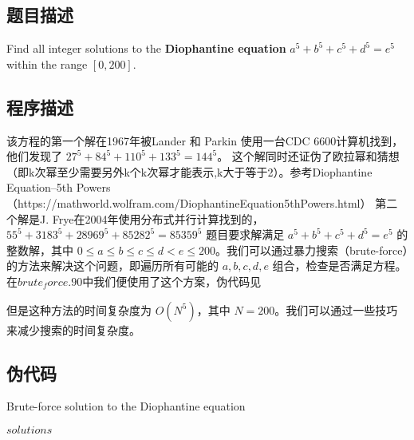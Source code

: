 \subsection{题目描述}
Find all integer solutions to the \textbf{Diophantine equation} \( a^5 + b^5 + c^5 + d^5 = e^5 \) within the range \([0, 200]\).
\subsection{程序描述}
该方程的第一个解在1967年被Lander 和 Parkin 使用一台CDC 6600计算机找到，他们发现了 \( 27^5 + 84^5 + 110^5 + 133^5 = 144^5 \)。
这个解同时还证伪了欧拉幂和猜想（即k次幂至少需要另外k个k次幂才能表示,k大于等于2）。参考Diophantine Equation--5th Powers（https://mathworld.wolfram.com/DiophantineEquation5thPowers.html）
第二个解是J. Frye在2004年使用分布式并行计算找到的，\( 55^5 + 3183^5 + 28969^5 + 85282^5 = 85359^5 \)
题目要求解满足 \( a^5 + b^5 + c^5 + d^5 = e^5 \) 的整数解，其中 \( 0 \leq a \leq b \leq c \leq d < e \leq 200 \)。我们可以通过暴力搜索（brute-force）的方法来解决这个问题，即遍历所有可能的 \( a, b, c, d, e \) 组合，检查是否满足方程。
在$brute_force.90$中我们便使用了这个方案，伪代码见

但是这种方法的时间复杂度为 \( O(N^5) \)，其中 \( N = 200 \)。我们可以通过一些技巧来减少搜索的时间复杂度。
\subsection{伪代码}

\begin{algorithm}[H]
    \caption{Brute-force solution to the Diophantine equation}
    \Return $solutions$
\end{algorithm}


